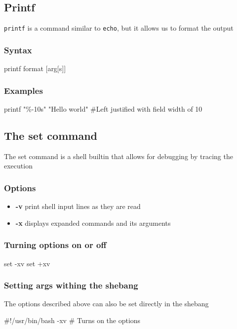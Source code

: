 \documentclass{report}
\begin{document}
    \subsection{Printf}
    \bigbreak \noindent 
    \texttt{printf} is a command similar to \texttt{echo}, but it allows us to format the output 
    \bigbreak \noindent 
    \subsubsection{Syntax}
    \bigbreak \noindent 
    \begin{bashcode}
        printf format [arg[s]]
    \end{bashcode}
    \bigbreak \noindent 
    \subsubsection{Examples}
    \bigbreak \noindent 
    \begin{bashcode}
    printf "\%-10s" "Hello world" #Left justified with field width of 10 
    \end{bashcode}

    \bigbreak \noindent 
    \subsection{The set command}
    \bigbreak \noindent 
    The set command is a shell builtin that allows for debugging by tracing the execution
    \bigbreak \noindent 
    \subsubsection{Options}
    \begin{itemize}
        \item \textbf{-v} print shell input lines as they are read 
        \item \textbf{-x} displays expanded commands and its arguments
    \end{itemize}

    \bigbreak \noindent 
    \subsubsection{Turning options on or off}
    \bigbreak \noindent 
    \begin{bashcode}
    set -xv
    set +xv
    \end{bashcode}

    \bigbreak \noindent 
    \subsubsection{Setting args withing the shebang}
    \bigbreak \noindent 
    The options described above can also be set directly in the shebang
    \bigbreak \noindent 
    \begin{bashcode}
    #!/usr/bin/bash -xv # Turns on the options
    \end{bashcode}
\end{document}
